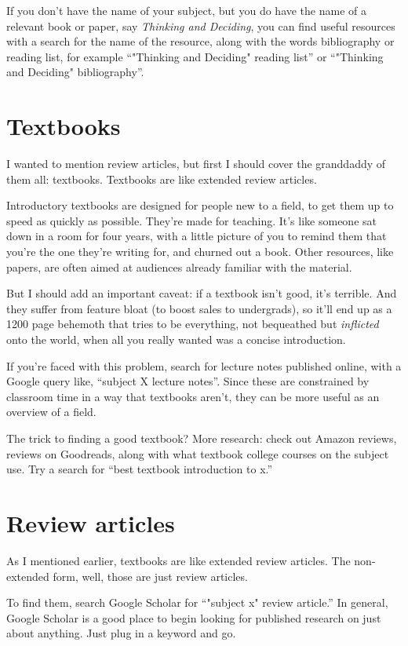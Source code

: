 If you don't have the name of your subject, but you do have the name of a
relevant book or paper, say \textit{Thinking and Deciding}, you can find useful resources with a search
for the name of the resource, along with the words bibliography or reading list,
for example ``"Thinking and Deciding" reading list'' or ``"Thinking and Deciding"
bibliography''.

\section{Textbooks}

I wanted to mention review articles, but first I should cover the granddaddy of
them all: textbooks. Textbooks are like extended review articles.

Introductory textbooks are designed for people new to a field, to get them up to
speed as quickly as possible. They're made for teaching. It's like someone sat
down in a room for four years, with a little picture of you to remind them that
you're the one they're writing for, and churned out a book. Other resources, like
papers, are often aimed at audiences already familiar with the
material.

But I should add an important caveat: if a textbook isn't good, it's terrible. And
they suffer from feature bloat (to boost sales to undergrads), so it'll end up
as a 1200 page
behemoth that tries to be everything, not bequeathed but \textit{inflicted} onto the world, when all you really wanted was a concise
introduction.

If you're faced with this problem, search for lecture notes published
online, with a Google query like, ``subject X lecture notes''. Since these are constrained by classroom time in a way that textbooks
aren't, they can be more useful as an overview of a field.

The trick to finding a good textbook? More research: check out
Amazon reviews, reviews on Goodreads, along with what textbook college courses on the
subject use. Try a search for ``best textbook introduction to x.''

\section{Review articles}

As I mentioned earlier, textbooks are like extended review articles. The
non-extended form, well, those are just review articles.

To find them, search Google Scholar for ``"subject x" review article.'' In general,
Google Scholar is a good place to begin looking for published research on just
about anything. Just plug in a keyword and go.

